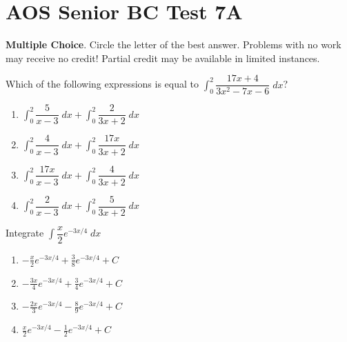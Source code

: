 \documentclass[
]{article}
\author{}
\date{}
\begin{document}
\pagestyle{empty}
\hypertarget{test-7}{%
\section{AOS Senior BC Test 7A}\label{test-7}}

\noindent \textbf{Multiple Choice}. Circle the letter of the best answer. Problems
with no work may receive no credit! Partial credit may be available in limited
instances.

\begin{enumerate}
	\setlength{\itemsep}{1in}
\def\labelenumi{\arabic{enumi}.}
\begin{minipage}{\linewidth}
\item
  Which of the following expressions is equal to
  \(\displaystyle \int_0^2 \dfrac{17x+4}{3x^2-7x-6} \; dx\)?

	\vspace{2ex}
  \begin{enumerate}
		\setlength{\itemsep}{2ex}\def\labelenumi{\Alph{enumi}.}

\item
  \(\displaystyle \int_0^2 \dfrac{5}{x-3} \; dx + \displaystyle \int_0^2 \dfrac{2}{3x+2} \; dx\)
\item
  \(\displaystyle \int_0^2 \dfrac{4}{x-3} \; dx + \displaystyle \int_0^2 \dfrac{17x}{3x+2} \; dx\)
\item
  \(\displaystyle \int_0^2 \dfrac{17x}{x-3} \; dx + \displaystyle \int_0^2 \dfrac{4}{3x+2} \; dx\)
\item
  \(\displaystyle \int_0^2 \dfrac{2}{x-3} \; dx + \displaystyle \int_0^2 \dfrac{5}{3x+2} \; dx\)
\end{enumerate}
\vspace{0.25in}
\end{minipage}

\begin{minipage}{\linewidth}
\item
  Integrate \(\displaystyle \int \dfrac{x}{2} e^{-3x/4} \; dx\)

	\vspace{2ex}
  \begin{enumerate}
		\setlength{\itemsep}{2ex}		\def\labelenumi{\Alph{enumi}.}
		\item
    \(-\frac{x}{2}e^{-3x/4} + \frac38 e^{-3x/4} + C\)
		 \item
    \(-\frac{3x}{4}e^{-3x/4} + \frac34 e^{-3x/4} + C\)
  \item
    \(-\frac{2x}{3}e^{-3x/4} - \frac89 e^{-3x/4} + C\)
  \item
    \(\frac{x}{2}e^{-3x/4} - \frac12 e^{-3x/4} + C\)
  \end{enumerate}
	\vspace{0.25in}


\end{minipage}
\end{enumerate}
\end{document}
